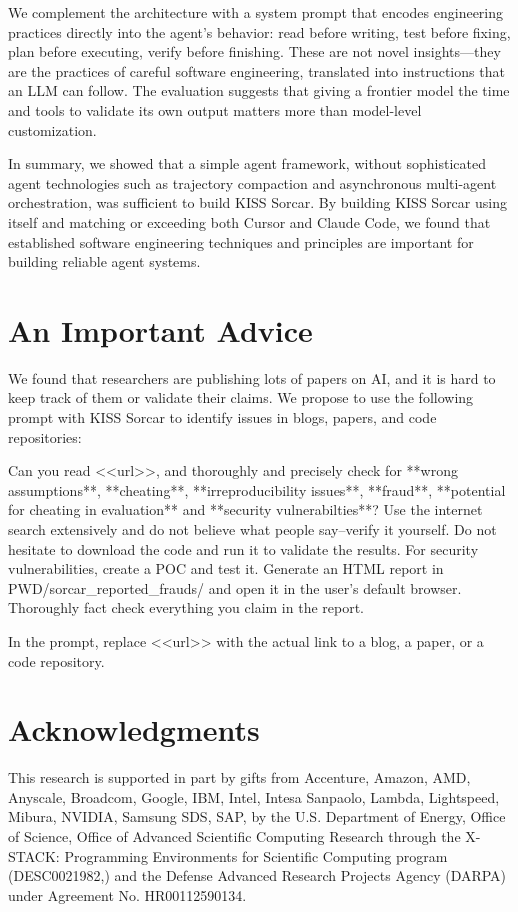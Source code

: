 \documentclass{article}
\begin{document}
We complement the architecture with a system prompt that encodes engineering practices directly into the agent's behavior: read before writing, test before fixing, plan before executing, verify before finishing.  These are not novel insights---they are the practices of careful software engineering, translated into instructions that an LLM can follow.  The evaluation suggests that giving a frontier model the time and tools to validate its own output matters more than model-level customization.

In summary, we showed that a simple agent framework, without sophisticated agent technologies such as trajectory compaction and asynchronous multi-agent orchestration, was sufficient to build KISS Sorcar.  By building KISS Sorcar using itself and matching or exceeding both Cursor and Claude Code, we found that established software engineering techniques and principles are important for building reliable agent systems.

\section*{An Important Advice} We found that researchers are publishing 
lots of papers on AI, and it is hard to keep track of them or validate their claims. We propose to use the following prompt with KISS Sorcar to identify issues in blogs, papers, and code repositories:

\begin{prompt}
Can you read <<url>>, and thoroughly and precisely check for **wrong assumptions**, **cheating**,
**irreproducibility issues**, **fraud**, **potential for cheating in evaluation**
and **security vulnerabilties**?  
Use the internet search extensively and do not believe what people say--verify it yourself.  
Do not hesitate to download the code and run it to validate the results.
For security vulnerabilities, create a POC and test it.  
Generate an HTML report in PWD/sorcar_reported_frauds/ and open it in the user's default browser.
Thoroughly fact check everything you claim in the report.
\end{prompt}
In the prompt, replace <<url>> with the actual link to a blog, a paper, or a code repository.

\section*{Acknowledgments}

This research is supported in part by gifts from Accenture, Amazon, AMD, Anyscale, Broadcom, Google, IBM, Intel, Intesa Sanpaolo, Lambda, Lightspeed, Mibura, NVIDIA, Samsung SDS, SAP, by the U.S. Department of Energy, Office of Science, Office of Advanced Scientific Computing Research through the X-STACK: Programming Environments for Scientific Computing program (DESC0021982,) and the Defense Advanced Research Projects Agency (DARPA) under Agreement No. HR00112590134.
\end{document}
